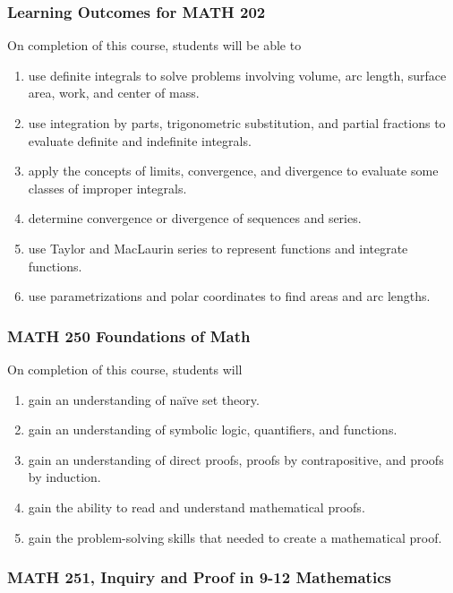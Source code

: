 \documentclass[11pt]{article}
\newenvironment{alphalist}{
  \begin{enumerate}[(1)]
    \addtolength{\itemsep}{-1.0\itemsep}}
  {\end{enumerate}}
\begin{document}
\subsubsection*{Learning Outcomes for MATH 202}

 On completion of this course, students will be able to
 \begin{alphalist}
    \item use definite integrals to solve problems involving volume, arc length, surface area, work, and center of mass. 
    \item use integration by parts, trigonometric substitution, and partial fractions to evaluate definite and indefinite integrals.
    \item apply the concepts of limits, convergence, and divergence to evaluate some classes of improper integrals.
    \item determine convergence or divergence of sequences and series.
    \item use Taylor and MacLaurin series to represent functions and integrate functions.
    \item use parametrizations and polar coordinates to find areas and arc lengths.
 \end{alphalist}

\subsubsection*{MATH 250 Foundations of Math}


On completion of this course, students will
\begin{alphalist}
    \item gain an understanding of naïve set theory. 
    \item gain an understanding of symbolic logic, quantifiers, and functions.
    \item gain an understanding of direct proofs, proofs by contrapositive, and proofs by induction.
    \item gain the ability to read and understand mathematical proofs.
    \item gain the problem-solving skills that needed to create a mathematical proof.
\end{alphalist}

\subsubsection*{MATH 251, Inquiry and Proof in 9-12 Mathematics}
\end{document}
